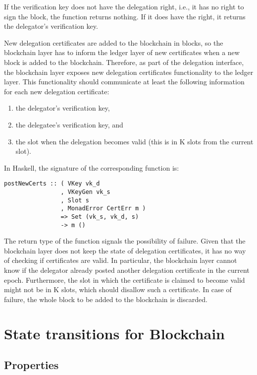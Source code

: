 \documentclass[11pt,a4paper]{article}
\begin{document}
If the verification key does not have the delegation right, i.e., it has no
right to sign the block, the function returns nothing.
%
If it does have the right, it returns the delegator's verification key.


New delegation certificates are added to the blockchain in blocks, so the
blockchain layer has to inform the ledger layer of new certificates when a new
block is added to the blockchain.
%
Therefore, as part of the delegation interface, the blockchain layer exposes
new delegation certificates functionality to the ledger layer.
%
This functionality should communicate at least the following information for
each new delegation certificate:
%
\begin{enumerate}
\item the delegator's verification key,
%
\item the delegatee's verification key, and
%
\item the slot when the delegation becomes valid (this is in K slots from the
  current slot).
\end{enumerate}
%
In Haskell, the signature of the corresponding function is:
%
\begin{lstlisting}
postNewCerts :: ( VKey vk_d
                , VKeyGen vk_s
                , Slot s
                , MonadError CertErr m )
                => Set (vk_s, vk_d, s)
                -> m ()
\end{lstlisting}
%
The return type of the function signals the possibility of failure.
%
Given that the blockchain layer does not keep the state of delegation
certificates, it has no way of checking if certificates are valid.
%
In particular, the blockchain layer cannot know if the delegator already
posted another delegation certificate in the current epoch.
%
Furthermore, the slot in which the certificate is claimed to become valid
might not be in K slots, which should disallow such a certificate.
%
In case of failure, the whole block to be added to the blockchain is
discarded.


\section{State transitions for Blockchain}
\label{sec:state-trans-chain}

\subsection{Properties}
\label{sec:chain-properties}
\end{document}

